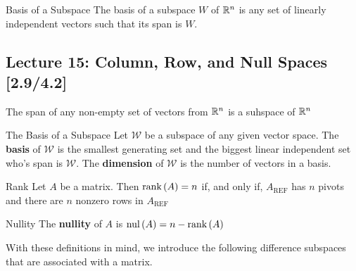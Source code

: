 \begin{example}{}{}
\end{example}

\begin{defbox}{Basis of a Subspace}{}
    The basis of a subspace $W$ of $\mathbb R^{n}$ is any set of linearly independent vectors such that its span is $W$.
\end{defbox}

\subsection{Lecture 15: Column, Row, and Null Spaces [2.9/4.2]}
\begin{thm}{}{}
    The span of any non-empty set of vectors from $\mathbb R^{n}$ is a suhspace of $\mathbb R^{n}$
\end{thm}

\begin{defbox}{The Basis of a Subspace}{}
    Let $\mathcal{W}$ be a subspace of any given vector space. The \textbf{basis} of $\mathcal{W}$ is the smallest generating set and the biggest linear independent set who's span is $\mathcal{W}$. The \textbf{dimension} of $\mathcal{W}$ is the number of vectors in a basis.
\end{defbox}

\begin{defbox}{Rank}{}
    Let $A$ be a matrix. Then $\text{rank}\left(A\right)=n$ if, and only if, $A_{\text{REF}}$ has $n$ pivots and there are $n$ nonzero rows in $A_{\text{REF}}$
\end{defbox}

\begin{defbox}{Nullity}{}
    The \textbf{nullity} of $A$ is $\text{nul}\left(A\right)=n-\text{rank}\left(A\right)$
\end{defbox}

With these definitions in mind, we introduce the following difference subspaces that are associated with a matrix.

\newpage

